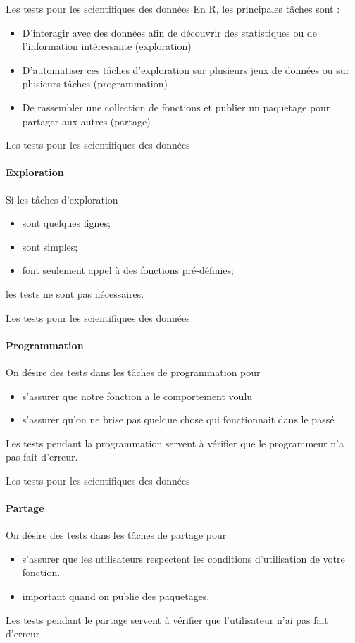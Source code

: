 \documentclass[11pt]{beamer}
\begin{document}
\begin{frame}{Les tests pour les scientifiques des données}
En \textsf{R}, les principales tâches sont :
\begin{itemize}
\item D'interagir avec des données afin de découvrir des statistiques ou de l'information intéressante (exploration)
\item D'automatiser ces tâches d'exploration sur plusieurs jeux de données ou sur plusieurs tâches (programmation)
\item De rassembler une collection de fonctions et publier un paquetage pour partager aux autres (partage)
\end{itemize}
\end{frame}

\begin{frame}{Les tests pour les scientifiques des données}
\framesubtitle{Exploration}
Si les tâches d'exploration
\begin{itemize}
\item sont quelques lignes;
\item sont simples;
\item font seulement appel à des fonctions pré-définies;
\end{itemize}
les tests ne sont pas nécessaires.
\end{frame}

\begin{frame}{Les tests pour les scientifiques des données}
\framesubtitle{Programmation}
On désire des tests dans les tâches de programmation pour 
\begin{itemize}
\item s'assurer que notre fonction a le comportement voulu
\item s'assurer qu'on ne brise pas quelque chose qui fonctionnait dans le passé
\end{itemize}
Les tests pendant la programmation servent à vérifier que le programmeur n'a pas fait d'erreur. 
\end{frame}

\begin{frame}{Les tests pour les scientifiques des données}
\framesubtitle{Partage}
On désire des tests dans les tâches de partage pour 
\begin{itemize}
\item s'assurer que les utilisateurs respectent les conditions d'utilisation de votre fonction.
\item important quand on publie des paquetages.
\end{itemize}
Les tests pendant le partage servent à vérifier que l'utilisateur n'ai pas fait d'erreur
\end{frame}
\end{document}
